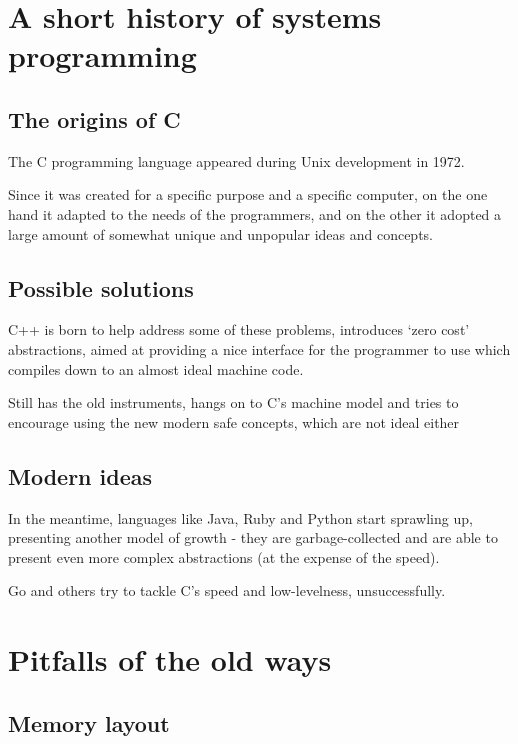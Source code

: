 \documentclass[usenames,twocolumn,dvipsnames,10pt,a4wide]{article}
\begin{document}
\section{A short history of systems programming}

\subsection{The origins of C}
\normalsize
The C programming language appeared during Unix development in 1972.

Since it was created for a specific purpose %
and a specific computer, %
on the one hand it adapted to the
needs of the programmers, and on the 
other it adopted a large
amount of somewhat unique and unpopular 
ideas and concepts.

\vskip 0.8cm



\subsection{Possible solutions}
C++ is born to help address some of these problems, 
introduces ‘zero cost’ abstractions, aimed at providing
a nice interface for the programmer to use which
compiles down to an almost ideal machine code.


Still has the old instruments, hangs on to C's machine
model %
and tries to encourage using the new 
modern safe concepts, 
which are not ideal either




\subsection{Modern ideas}

In the meantime, languages like Java, Ruby and
Python start sprawling up, presenting another
model of growth - they are garbage-collected
and are able to present even more complex
abstractions (at the expense of the speed).



Go and others try to tackle C's speed and
low-levelness, unsuccessfully.



\section{Pitfalls of the old ways}

\subsection{Memory layout} 
\inputminted[fontsize=\normalsize]{c}{code/stack.c}
\end{document}
